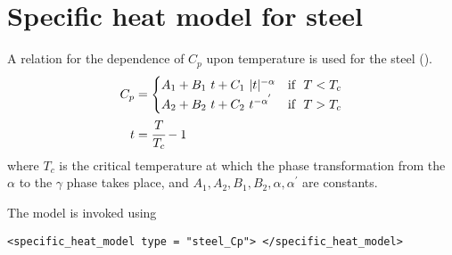 \section{Specific heat model for steel}
A relation for the dependence of $C_p$ upon temperature is
used for the steel (\cite{Lederman1974}).
\begin{align}
  C_p & = \begin{cases}
          A_1 + B_1~t + C_1~|t|^{-\alpha} & \text{if}~~ T < T_c \\
          A_2 + B_2~t + C_2~t^{-\alpha^{'}} & \text{if}~~ T > T_c 
        \end{cases} \label{eq:CpSteel}\\
  t & = \cfrac{T}{T_c} - 1 
\end{align}
where $T_c$ is the critical temperature at which the phase transformation
from the $\alpha$ to the $\gamma$ phase takes place, and $A_1, A_2, B_1, B_2,
\alpha, \alpha^{'}$ are constants.

The model is invoked using
\lstset{language=XML}
\begin{lstlisting}
<specific_heat_model type = "steel_Cp"> </specific_heat_model>
\end{lstlisting}



